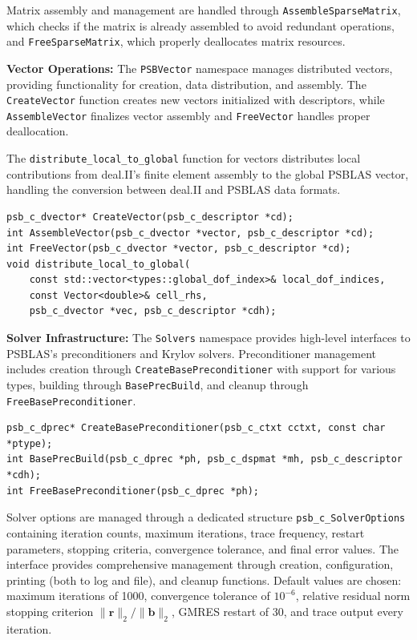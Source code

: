 \documentclass[a4paper,12pt]{article}
\begin{document}
Matrix assembly and management are handled through \texttt{AssembleSparseMatrix}, which 
checks if the matrix is already assembled to avoid redundant operations, 
and \texttt{FreeSparseMatrix}, which properly deallocates matrix resources.

\textbf{Vector Operations:} The \texttt{PSBVector} namespace manages distributed vectors, 
providing functionality for creation, data distribution, and assembly. 
The \texttt{CreateVector} function creates new vectors initialized with descriptors, 
while \texttt{AssembleVector} finalizes vector assembly and \texttt{FreeVector} handles proper 
deallocation. 

The \texttt{distribute\_local\_to\_global} function for vectors distributes local 
contributions from deal.II's finite element assembly to the global PSBLAS vector, 
handling the conversion between deal.II and PSBLAS data formats.

\begin{lstlisting}[caption=Vector operations]
psb_c_dvector* CreateVector(psb_c_descriptor *cd);
int AssembleVector(psb_c_dvector *vector, psb_c_descriptor *cd);
int FreeVector(psb_c_dvector *vector, psb_c_descriptor *cd);
void distribute_local_to_global(
    const std::vector<types::global_dof_index>& local_dof_indices,
    const Vector<double>& cell_rhs,
    psb_c_dvector *vec, psb_c_descriptor *cdh);
\end{lstlisting}

\textbf{Solver Infrastructure:} The \texttt{Solvers} namespace provides high-level 
interfaces to PSBLAS's preconditioners and Krylov solvers. Preconditioner management 
includes creation through \texttt{CreateBasePreconditioner} with support for various 
types, building through \texttt{BasePrecBuild}, and cleanup through 
\texttt{FreeBasePreconditioner}.

\begin{lstlisting}[caption=Preconditioner and solver management]
psb_c_dprec* CreateBasePreconditioner(psb_c_ctxt cctxt, const char *ptype);
int BasePrecBuild(psb_c_dprec *ph, psb_c_dspmat *mh, psb_c_descriptor *cdh);
int FreeBasePreconditioner(psb_c_dprec *ph);
\end{lstlisting}

Solver options are managed through a dedicated structure \texttt{psb\_c\_SolverOptions} 
containing iteration counts, maximum iterations, trace frequency, restart parameters, 
stopping criteria, convergence tolerance, and final error values. The interface provides 
comprehensive management through creation, configuration, printing (both to log and file), 
and cleanup functions. Default values are chosen: maximum iterations of 1000, 
convergence tolerance of $10^{-6}$, relative residual norm stopping criterion 
$\|\mathbf{r}\|_2/\|\mathbf{b}\|_2$, GMRES restart of 30, and trace output every iteration.
\end{document}
